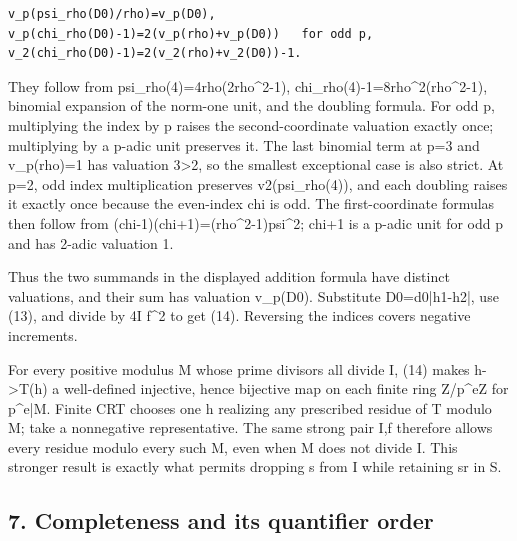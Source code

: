 \begin{verbatim}
v_p(psi_rho(D0)/rho)=v_p(D0),
v_p(chi_rho(D0)-1)=2(v_p(rho)+v_p(D0))   for odd p,
v_2(chi_rho(D0)-1)=2(v_2(rho)+v_2(D0))-1.
\end{verbatim}

They follow from psi\_\allowbreak{}rho(4)=\allowbreak{}4rho(2rho\textasciicircum{}\allowbreak{}2-1), chi\_\allowbreak{}rho(4)-1=\allowbreak{}8rho\textasciicircum{}\allowbreak{}2(rho\textasciicircum{}\allowbreak{}2-1), binomial expansion of the norm-one unit, and the doubling formula. For odd p, multiplying the index by p raises the second-coordinate valuation exactly once; multiplying by a p-adic unit preserves it. The last binomial term at p=\allowbreak{}3 and v\_\allowbreak{}p(rho)=\allowbreak{}1 has valuation 3\textgreater{}\allowbreak{}2, so the smallest exceptional case is also strict. At p=\allowbreak{}2, odd index multiplication preserves v2(psi\_\allowbreak{}rho(4)), and each doubling raises it exactly once because the even-index chi is odd. The first-coordinate formulas then follow from (chi-1)(chi+\allowbreak{}1)=\allowbreak{}(rho\textasciicircum{}\allowbreak{}2-1)psi\textasciicircum{}\allowbreak{}2; chi+\allowbreak{}1 is a p-adic unit for odd p and has 2-adic valuation 1.



Thus the two summands in the displayed addition formula have distinct valuations, and their sum has valuation v\_\allowbreak{}p(D0). Substitute D0=\allowbreak{}d0\textasteriskcentered{}\allowbreak{}|h1-h2|, use (13), and divide by 4I f\textasciicircum{}\allowbreak{}2 to get (14). Reversing the indices covers negative increments.



For every positive modulus M whose prime divisors all divide I, (14) makes h-\textgreater{}\allowbreak{}T(h) a well-defined injective, hence bijective map on each finite ring Z/\allowbreak{}p\textasciicircum{}\allowbreak{}eZ for p\textasciicircum{}\allowbreak{}e|M. Finite CRT chooses one h realizing any prescribed residue of T modulo M; take a nonnegative representative. The same strong pair I,f therefore allows every residue modulo every such M, even when M does not divide I. This stronger result is exactly what permits dropping s from I while retaining sr in S.



\subsection*{7. Completeness and its quantifier order}



